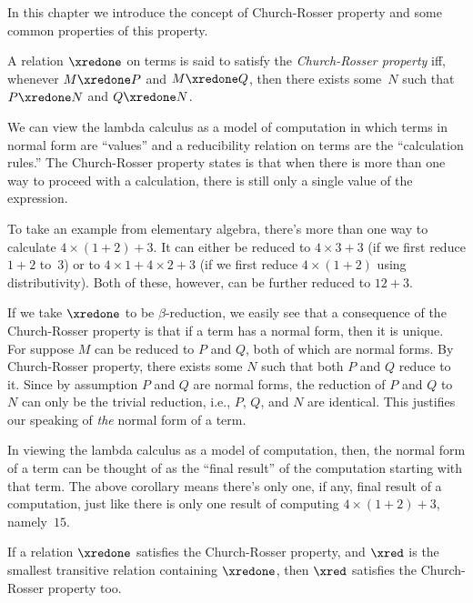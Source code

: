 \documentclass[../../../include/open-logic-section]{subfiles}
\begin{document}


In this chapter we introduce the concept of Church-Rosser property and
some common properties of this property.

\begin{defn} A relation $\xredone$ on
  terms is said to satisfy the \emph{Church-Rosser property} iff,
  whenever $M \xredone P$ and $M \xredone Q$, then there exists
  some~$N$ such that $P \xredone N$ and $Q \xredone N$.
\end{defn}

We can view the lambda calculus as a model of computation in which
terms in normal form are ``values'' and a reducibility relation on
terms are the ``calculation rules.'' The Church-Rosser property states
is that when there is more than one way to proceed with a calculation,
there is still only a single value of the expression.

To take an example from elementary algebra, there's more than one way
to calculate $4 \times (1+2) + 3$. It can either be reduced to $4
\times 3+3$ (if we first reduce $1+2$ to~$3$) or to $4 \times 1+4
\times 2+3$ (if we first reduce $4 \times (1+2)$ using
distributivity). Both of these, however, can be further reduced to
$12+3$.

If we take $\xredone$ to be $\beta$-reduction, we easily see that a
consequence of the Church-Rosser property is that if a term has a
normal form, then it is unique. For suppose $M$ can be reduced to $P$
and $Q$, both of which are normal forms. By Church-Rosser property,
there exists some $N$ such that both $P$ and $Q$ reduce to it. Since
by assumption $P$ and $Q$ are normal forms, the reduction of $P$ and
$Q$ to $N$ can only be the trivial reduction, i.e., $P$, $Q$, and $N$
are identical. This justifies our speaking of \emph{the} normal form
of a term.

In viewing the lambda calculus as a model of computation, then, the
normal form of a term can be thought of as the ``final result'' of the
computation starting with that term. The above corollary means there's
only one, if any, final result of a computation, just like there is
only one result of computing $4 \times (1+2)+3$, namely~$15$.

\begin{thm} 
  If a relation $\xredone$ satisfies the Church-Rosser property, and $\xred$ is the
  smallest transitive relation containing $\xredone$, then $\xred$ satisfies
  the Church-Rosser property too.
\end{thm}
\end{document}
